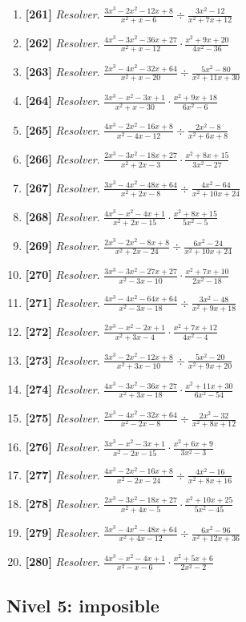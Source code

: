 \documentclass[11pt,a4paper]{article}
\newcommand{\nivel}[2]{\subsection*{Nivel #1: #2}\addcontentsline{toc}{subsection}{Nivel #1: #2}}
\newcommand{\ejercicio}[3]{\item \textbf{[#1]} \textit{#2}. $ #3 $}
\begin{document}
\begin{enumerate}
\ejercicio{261}{Resolver}{\frac{3 x^{3} - 2 x^{2} - 12 x + 8}{x^{2} + x - 6} \div \frac{3 x^{2} - 12}{x^{2} + 7 x + 12}}
\ejercicio{262}{Resolver}{\frac{4 x^{3} - 3 x^{2} - 36 x + 27}{x^{2} + x - 12} \cdot \frac{x^{2} + 9 x + 20}{4 x^{2} - 36}}
\ejercicio{263}{Resolver}{\frac{2 x^{3} - 4 x^{2} - 32 x + 64}{x^{2} + x - 20} \div \frac{5 x^{2} - 80}{x^{2} + 11 x + 30}}
\ejercicio{264}{Resolver}{\frac{3 x^{3} - x^{2} - 3 x + 1}{x^{2} + x - 30} \cdot \frac{x^{2} + 9 x + 18}{6 x^{2} - 6}}
\ejercicio{265}{Resolver}{\frac{4 x^{3} - 2 x^{2} - 16 x + 8}{x^{2} - 4 x - 12} \div \frac{2 x^{2} - 8}{x^{2} + 6 x + 8}}
\ejercicio{266}{Resolver}{\frac{2 x^{3} - 3 x^{2} - 18 x + 27}{x^{2} + 2 x - 3} \cdot \frac{x^{2} + 8 x + 15}{3 x^{2} - 27}}
\ejercicio{267}{Resolver}{\frac{3 x^{3} - 4 x^{2} - 48 x + 64}{x^{2} + 2 x - 8} \div \frac{4 x^{2} - 64}{x^{2} + 10 x + 24}}
\ejercicio{268}{Resolver}{\frac{4 x^{3} - x^{2} - 4 x + 1}{x^{2} + 2 x - 15} \cdot \frac{x^{2} + 8 x + 15}{5 x^{2} - 5}}
\ejercicio{269}{Resolver}{\frac{2 x^{3} - 2 x^{2} - 8 x + 8}{x^{2} + 2 x - 24} \div \frac{6 x^{2} - 24}{x^{2} + 10 x + 24}}
\ejercicio{270}{Resolver}{\frac{3 x^{3} - 3 x^{2} - 27 x + 27}{x^{2} - 3 x - 10} \cdot \frac{x^{2} + 7 x + 10}{2 x^{2} - 18}}
\ejercicio{271}{Resolver}{\frac{4 x^{3} - 4 x^{2} - 64 x + 64}{x^{2} - 3 x - 18} \div \frac{3 x^{2} - 48}{x^{2} + 9 x + 18}}
\ejercicio{272}{Resolver}{\frac{2 x^{3} - x^{2} - 2 x + 1}{x^{2} + 3 x - 4} \cdot \frac{x^{2} + 7 x + 12}{4 x^{2} - 4}}
\ejercicio{273}{Resolver}{\frac{3 x^{3} - 2 x^{2} - 12 x + 8}{x^{2} + 3 x - 10} \div \frac{5 x^{2} - 20}{x^{2} + 9 x + 20}}
\ejercicio{274}{Resolver}{\frac{4 x^{3} - 3 x^{2} - 36 x + 27}{x^{2} + 3 x - 18} \cdot \frac{x^{2} + 11 x + 30}{6 x^{2} - 54}}
\ejercicio{275}{Resolver}{\frac{2 x^{3} - 4 x^{2} - 32 x + 64}{x^{2} - 2 x - 8} \div \frac{2 x^{2} - 32}{x^{2} + 8 x + 12}}
\ejercicio{276}{Resolver}{\frac{3 x^{3} - x^{2} - 3 x + 1}{x^{2} - 2 x - 15} \cdot \frac{x^{2} + 6 x + 9}{3 x^{2} - 3}}
\ejercicio{277}{Resolver}{\frac{4 x^{3} - 2 x^{2} - 16 x + 8}{x^{2} - 2 x - 24} \div \frac{4 x^{2} - 16}{x^{2} + 8 x + 16}}
\ejercicio{278}{Resolver}{\frac{2 x^{3} - 3 x^{2} - 18 x + 27}{x^{2} + 4 x - 5} \cdot \frac{x^{2} + 10 x + 25}{5 x^{2} - 45}}
\ejercicio{279}{Resolver}{\frac{3 x^{3} - 4 x^{2} - 48 x + 64}{x^{2} + 4 x - 12} \div \frac{6 x^{2} - 96}{x^{2} + 12 x + 36}}
\ejercicio{280}{Resolver}{\frac{4 x^{3} - x^{2} - 4 x + 1}{x^{2} - x - 6} \cdot \frac{x^{2} + 5 x + 6}{2 x^{2} - 2}}
\end{enumerate}
\nivel{5}{imposible}
\end{document}
